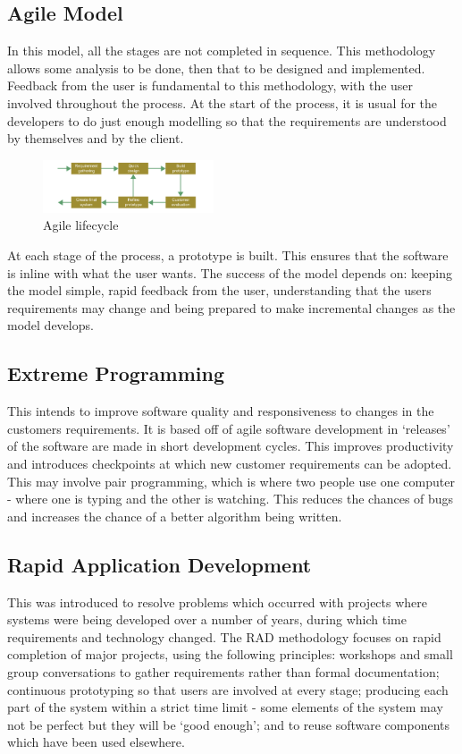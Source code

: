 \documentclass[a4paper,11pt, twocolumn]{article}
\begin{document}
\subsection{Agile Model}
In this model, all the stages are not completed in sequence. This methodology allows some analysis to be done, then that to be designed and implemented. Feedback from the user is fundamental to this methodology, with the user involved throughout the process. At the start of the process, it is usual for the developers to do just enough modelling so that the requirements are understood by themselves and by the client.
\begin{figure}[H]
    \centering
    \includegraphics[width=0.45\textwidth]{images/agile.png}
    \caption{Agile lifecycle}
    \label{fig:agile}
\end{figure}
\noindent At each stage of the process, a prototype is built. This ensures that the software is inline with what the user wants. The success of the model depends on: keeping the model simple, rapid feedback from the user, understanding that the users requirements may change and being prepared to make incremental changes as the model develops.
\subsection{Extreme Programming}
This intends to improve software quality and responsiveness to changes in the customers requirements. It is based off of agile software development in `releases' of the software are made in short development cycles. This improves productivity and introduces checkpoints at which new customer requirements can be adopted. This may involve pair programming, which is where two people use one computer - where one is typing and the other is watching. This reduces the chances of bugs and increases the chance of a better algorithm being written.
\subsection{Rapid Application Development}
This was introduced to resolve problems which occurred with projects where systems were being developed over a number of years, during which time requirements and technology changed. The RAD methodology focuses on rapid completion of major projects, using the following principles: workshops and small group conversations to gather requirements rather than formal documentation; continuous prototyping so that users are involved at every stage; producing each part of the system within a strict time limit - some elements of the system may not be perfect but they will be `good enough'; and to reuse software components which have been used elsewhere.
\end{document}
